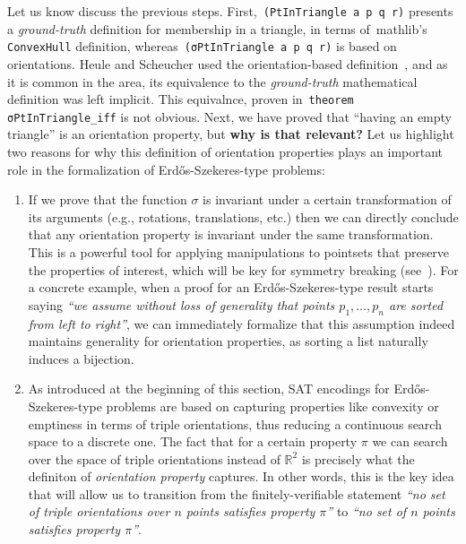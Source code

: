 Let us know discuss the previous steps. First,~\lstinline|(PtInTriangle a p q r)| presents a \emph{ground-truth}  definition for membership in a triangle, in terms of~\textsf{mathlib}'s \lstinline|ConvexHull| definition,  whereas~\lstinline|(σPtInTriangle a p q r)| is based on orientations. Heule and Scheucher used the orientation-based definition~\cite{emptyHexagonNumber}, and as it is common in the area, its equivalence to the \emph{ground-truth} mathematical definition was left implicit. This equivalnce, proven in~\lstinline|theorem σPtInTriangle_iff| is not obvious. Next, we have proved that ``having an empty triangle'' is an orientation property, but \textbf{why is that relevant?} Let us highlight two reasons for why this definition of orientation properties plays an important role in the formalization of Erd\H{o}s-Szekeres-type problems:
\begin{enumerate}
  \item If we prove that the function $\sigma$ is invariant under a certain transformation of its arguments (e.g., rotations, translations, etc.) then we can directly conclude that any orientation property is invariant under the same transformation. This is a powerful tool for applying manipulations to pointsets that preserve the properties of interest, which will be key for symmetry breaking (see~). For a concrete example, when a proof for an Erd\H{o}s-Szekeres-type result starts saying \emph{``we assume without loss of generality that points $p_1, \ldots, p_n$ are sorted from left to right''}, we can immediately formalize that this assumption indeed maintains generality for orientation properties, as sorting a list naturally induces a bijection. 
  \item As introduced at the beginning of this section, SAT encodings for Erd\H{o}s-Szekeres-type problems are based on capturing properties like convexity or emptiness in terms of triple orientations, thus reducing a continuous search space to a discrete one. The fact that for a certain property $\pi$ we can search over the space of triple orientations instead of $\mathbb{R}^2$ is precisely what the definiton of \emph{orientation property} captures. In other words, this is the key idea that will allow us to transition from the finitely-verifiable statement \emph{``no set of triple orientations over $n$ points satisfies property $\pi$''} to \emph{``no set of $n$ points satisfies property $\pi$''}.
\end{enumerate}



